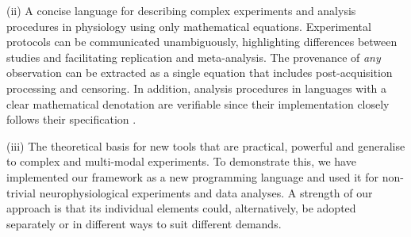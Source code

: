 (ii) A concise language for describing complex experiments and
analysis procedures in physiology using only mathematical
equations. Experimental protocols can be communicated unambiguously,
highlighting differences between studies and facilitating replication
and meta-analysis. The provenance \citep{Pool2002, MackenzieGraham2008,
  VanHorn2009} of \emph{any} observation can be extracted as a single
equation that includes post-acquisition processing and censoring. In
addition, analysis procedures in languages with a clear mathematical
denotation are verifiable since their implementation closely
follows their specification \citep{Bird1996}.

(iii) The theoretical basis for new tools that are practical, powerful
and generalise to complex and multi-modal experiments. To demonstrate
this, we have implemented our framework as a new programming language
and used it for non-trivial neurophysiological experiments and data
analyses. A strength of our approach is that its individual elements
could, alternatively, be adopted separately or in different ways to
suit different demands.
